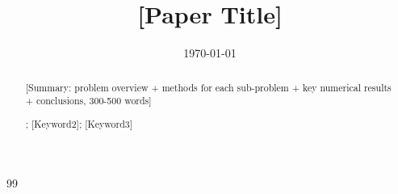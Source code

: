 \documentclass{mcmthesis}
\title{[Paper Title]}
\date{\today}
\begin{document}
\begin{abstract}

[Summary: problem overview + methods for each sub-problem + key numerical results + conclusions, 300-500 words]

\begin{keywords}
[Keyword1]; [Keyword2]; [Keyword3]
\end{keywords}
\end{abstract}

\maketitle
\tableofcontents
\newpage









\begin{thebibliography}{99}
\end{thebibliography}

\begin{appendices}

\end{appendices}
\end{document}
